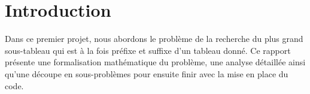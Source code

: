 \section{Introduction}\label{introduction}
Dans ce premier projet, nous abordons le problème de la recherche du plus grand sous-tableau qui est à la fois préfixe et suffixe d'un tableau donné. Ce rapport présente une formalisation mathématique du problème, une analyse détaillée ainsi qu'une découpe en sous-problèmes pour ensuite finir avec la mise en place du code.